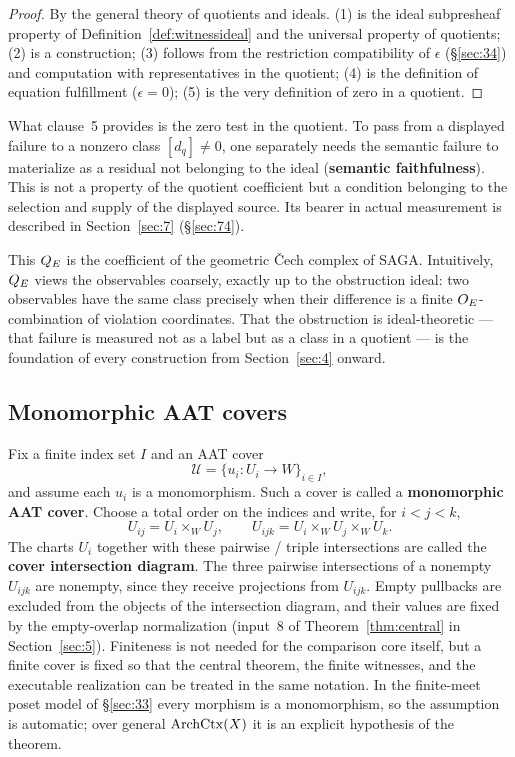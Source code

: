 \begin{proof}
By the general theory of quotients and ideals. (1) is the ideal
subpresheaf property of Definition~\ref{def:witnessideal} and the
universal property of quotients; (2) is a construction; (3) follows from
the restriction compatibility of $\epsilon$
(\S\ref{sec:34}) and computation with
representatives in the quotient; (4) is the definition of equation
fulfillment ($\epsilon=0$); (5) is the very definition of zero in a
quotient.
\end{proof}

What clause~5 provides is the zero test in the quotient. To pass from a
displayed failure to a nonzero class $[d_q]\neq0$, one separately needs
the semantic failure to materialize as a residual not belonging to the
ideal (\textbf{semantic faithfulness}). This is not a property of the
quotient coefficient but a condition belonging to the selection and
supply of the displayed source. Its bearer in actual measurement is
described in Section~\ref{sec:7} (\S\ref{sec:74}).

This $Q_{E}$ is the coefficient of the geometric \v{C}ech complex of SAGA.
Intuitively, $Q_{E}$ views the observables coarsely, exactly up to the
obstruction ideal: two observables have the same class precisely when
their difference is a finite $O_{E}$-combination of violation
coordinates. That the obstruction is ideal-theoretic --- that failure is
measured not as a label but as a class in a quotient --- is the
foundation of every construction from Section~\ref{sec:4} onward.

\subsection{Monomorphic AAT covers}\label{sec:37}

Fix a finite index set $I$ and an AAT cover
\[
\mathcal U=\{u_i:U_i\to W\}_{i\in I},
\]
and assume each $u_i$ is a monomorphism. Such a cover is called a
\textbf{monomorphic AAT cover}. Choose a total order on the indices and
write, for $i<j<k$,
\[
U_{ij}=U_i\times_W U_j,\qquad
U_{ijk}=U_i\times_W U_j\times_W U_k.
\]
The charts $U_i$ together with these pairwise / triple intersections are
called the \textbf{cover intersection diagram}. The three pairwise
intersections of a nonempty $U_{ijk}$ are nonempty, since they receive
projections from $U_{ijk}$. Empty pullbacks are excluded from the
objects of the intersection diagram, and their values are fixed by the
empty-overlap normalization (input~8 of Theorem~\ref{thm:central} in
Section~\ref{sec:5}). Finiteness is not needed for the comparison core
itself, but a finite cover is fixed so that the central theorem, the
finite witnesses, and the executable realization can be treated in the
same notation. In the finite-meet poset model of \S\ref{sec:33} every
morphism is a monomorphism, so the assumption is automatic; over general
$\mathrm{ArchCtx}(X)$ it is an explicit hypothesis of the theorem.

